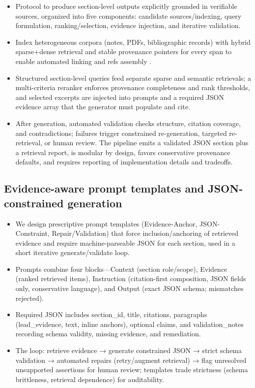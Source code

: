 \documentclass{article}%
\providecommand{\tightlist}{}%
\begin{document}
%
\begin{itemize}
\tightlist
\item
  Protocol to produce section-level outputs explicitly grounded in verifiable sources, organized into five components: candidate sources/indexing, query formulation, ranking/selection, evidence injection, and iterative validation.
\item
  Index heterogeneous corpora (notes, PDFs, bibliographic records) with hybrid sparse+dense retrieval and stable provenance pointers for every span to enable automated linking and refs assembly \cite{2102.11903v2}\cite{2210.05512v1}\cite{2103.16669v3}.
\item
  Structured section-level queries feed separate sparse and semantic retrievals; a multi-criteria reranker enforces provenance completeness and rank thresholds, and selected excerpts are injected into prompts and a required JSON evidence array that the generator must populate and cite.
\item
  After generation, automated validation checks structure, citation coverage, and contradictions; failures trigger constrained re-generation, targeted re-retrieval, or human review. The pipeline emits a validated JSON section plus a retrieval report, is modular by design, favors conservative provenance defaults, and requires reporting of implementation details and tradeoffs.
\end{itemize}%

%
\subsection{Evidence{-}aware prompt templates and JSON{-}constrained generation}%


%
\begin{itemize}
\tightlist
\item
  We design prescriptive prompt templates (Evidence-Anchor, JSON-Constraint, Repair/Validation) that force inclusion/anchoring of retrieved evidence and require machine-parseable JSON for each section, used in a short iterative generate/validate loop.\\
\item
  Prompts combine four blocks---Context (section role/scope), Evidence (ranked retrieved items), Instruction (citation-first composition, JSON fields only, conservative language), and Output (exact JSON schema; mismatches rejected).\\
\item
  Required JSON includes section\_id, title, citations, paragraphs (lead\_evidence, text, inline anchors), optional claims, and validation\_notes recording schema validity, missing evidence, and remediation.\\
\item
  The loop: retrieve evidence → generate constrained JSON → strict schema validation → automated repairs (retry/augment retrieval) → flag unresolved unsupported assertions for human review; templates trade strictness (schema brittleness, retrieval dependence) for auditability.
\end{itemize}%
\end{document}
